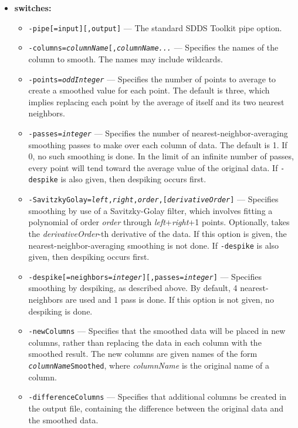 \begin{itemize}
\item {\bf switches:}
    \begin{itemize}
    \item \verb|-pipe[=input][,output]| --- The standard SDDS Toolkit pipe option.
    \item {\tt -columns={\em columnName}[,{\em columnName...}} --- Specifies the names of the column to smooth.
        The names may include wildcards.
    \item {\tt -points={\em oddInteger}} --- Specifies the number of points to average to create a smoothed
        value for each point.  The default is three, which implies replacing each point by the average
        of itself and its two nearest neighbors.
    \item {\tt -passes={\em integer}} --- Specifies the number of nearest-neighbor-averaging
        smoothing passes to make over each column
        of data.  The default is 1.  If 0, no such smoothing is done.
        In the limit of an infinite number of passes, every point will 
        tend toward the average value of the original data.    If {\tt -despike} is also given,
        then despiking occurs first.
    \item {\tt -SavitzkyGolay={\em left},{\em right},{\em order},[{\em derivativeOrder}]} ---
        Specifies smoothing by use of a Savitzky-Golay filter, which involves fitting a
        polynomial of order {\em order} through {\em left}+{\em right}+1 points.  Optionally,
        takes the {\em derivativeOrder}-th derivative of the data.  If this option is given,
        the nearest-neighbor-averaging smoothing is not done.  If {\tt -despike} is also given,
        then despiking occurs first.
    \item {\tt -despike[=neighbors={\em integer}][,passes={\em integer}]} ---
        Specifies smoothing by despiking, as described above.  By default, 4 nearest-neighbors
        are used and 1 pass is done.  If this option is not given, no despiking is done.
    \item {\tt -newColumns} --- Specifies that the smoothed data will be placed in new columns, rather than
        replacing the data in each column with the smoothed result.  The new columns are given names of
        the form {\tt {\em columnName}Smoothed}, where {\em columnName} is the original name of a column.
    \item {\tt -differenceColumns} --- Specifies that additional columns be created in the output file,
        containing the difference between the original data and the smoothed data.

\end{itemize}
\end{itemize}
